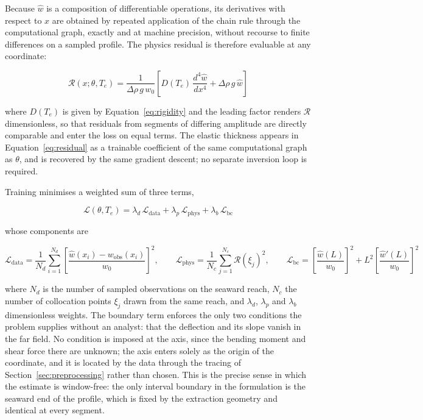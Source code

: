 \documentclass[final]{agujournal2019}
\begin{document}
Because $\hat{w}$ is a composition of differentiable operations, its derivatives
with respect to $x$ are obtained by repeated application of the chain rule
through the computational graph, exactly and at machine precision, without
recourse to finite differences on a sampled profile. The physics residual is therefore
evaluable at any coordinate:
\begin{linenomath*}
\begin{equation}
  \mathcal{R}(x;\theta,T_{e}) = \frac{1}{\Delta\rho\,g\,w_{0}}
  \left[D(T_{e})\,\frac{d^{4}\hat{w}}{dx^{4}} + \Delta\rho\,g\,\hat{w}\right]
  \label{eq:residual}
\end{equation}
\end{linenomath*}
where $D(T_{e})$ is given by Equation~\eqref{eq:rigidity} and the leading factor
renders $\mathcal{R}$ dimensionless, so that residuals from segments of
differing amplitude are directly comparable and enter the loss on equal terms.
The elastic thickness appears in Equation~\eqref{eq:residual} as a trainable
coefficient of the same computational graph as $\theta$, and is recovered by the
same gradient descent; no separate inversion loop is required.

Training minimises a weighted sum of three terms,
\begin{linenomath*}
\begin{equation}
  \mathcal{L}(\theta,T_{e}) = \lambda_{d}\,\mathcal{L}_{\mathrm{data}}
  + \lambda_{p}\,\mathcal{L}_{\mathrm{phys}}
  + \lambda_{b}\,\mathcal{L}_{\mathrm{bc}}
  \label{eq:loss}
\end{equation}
\end{linenomath*}
whose components are
\begin{linenomath*}
\begin{equation}
  \mathcal{L}_{\mathrm{data}} = \frac{1}{N_{d}}\sum_{i=1}^{N_{d}}
  \left[\frac{\hat{w}(x_{i})-w_{\mathrm{obs}}(x_{i})}{w_{0}}\right]^{2},
  \qquad
  \mathcal{L}_{\mathrm{phys}} = \frac{1}{N_{c}}\sum_{j=1}^{N_{c}}
  \mathcal{R}(\xi_{j})^{2},
  \qquad
  \mathcal{L}_{\mathrm{bc}} =
  \left[\frac{\hat{w}(L)}{w_{0}}\right]^{2}
  + L^{2}\left[\frac{\hat{w}'(L)}{w_{0}}\right]^{2}
  \label{eq:lossterms}
\end{equation}
\end{linenomath*}
where $N_{d}$ is the number of sampled observations on the seaward reach,
$N_{c}$ the number of collocation points $\xi_{j}$ drawn from the same reach,
and $\lambda_{d}$, $\lambda_{p}$ and $\lambda_{b}$ dimensionless weights. The
boundary term enforces the only two conditions the problem supplies without an
analyst: that the deflection and its slope vanish in the far field. No condition
is imposed at the axis, since the bending moment and shear force there are
unknown; the axis enters solely as the origin of the coordinate, and it is
located by the data through the tracing of Section~\ref{sec:preprocessing}
rather than chosen. This is the precise sense in which the estimate is
window-free: the only interval boundary in the formulation is the seaward end of
the profile, which is fixed by the extraction geometry and identical at every
segment.
\end{document}
